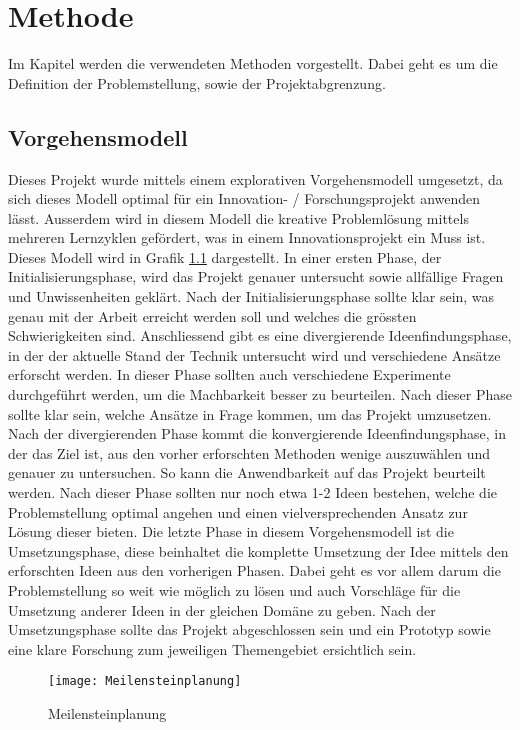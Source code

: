 \chapter{Methode}
\label{ch:Methode}
Im Kapitel  werden die verwendeten Methoden vorgestellt. Dabei geht es um die Definition der
Problemstellung, sowie der Projektabgrenzung.

\section{Vorgehensmodell}
\label{sec:Vorgehensmodell}
Dieses Projekt wurde mittels einem explorativen Vorgehensmodell umgesetzt, da sich dieses Modell optimal für ein
Innovation- / Forschungsprojekt anwenden lässt. Ausserdem wird in diesem Modell die kreative Problemlösung mittels
mehreren Lernzyklen gefördert, was in einem Innovationsprojekt ein Muss ist. Dieses Modell wird in Grafik
\ref{fig:Meilensteinplanung} dargestellt.
\newline
\newline
In einer ersten Phase, der Initialisierungsphase, wird das Projekt genauer untersucht sowie allfällige Fragen und
Unwissenheiten geklärt. Nach der Initialisierungsphase sollte klar sein, was genau mit der Arbeit erreicht werden soll
und welches die grössten Schwierigkeiten sind. 
\newline
\newline
Anschliessend gibt es eine divergierende Ideenfindungsphase, in der der aktuelle Stand der Technik untersucht wird und
verschiedene Ansätze erforscht werden. In dieser Phase sollten auch verschiedene Experimente durchgeführt werden, um die
Machbarkeit besser zu beurteilen. Nach dieser Phase sollte klar sein, welche Ansätze in Frage kommen, um das Projekt
umzusetzen.
\newline
\newline
Nach der divergierenden Phase kommt die konvergierende Ideenfindungsphase, in der das Ziel ist, aus den vorher
erforschten Methoden wenige auszuwählen und genauer zu untersuchen. So kann die Anwendbarkeit auf das Projekt beurteilt
werden. Nach dieser Phase sollten nur noch etwa 1-2 Ideen bestehen, welche die Problemstellung optimal angehen und einen
vielversprechenden Ansatz zur Lösung dieser bieten.
\newline
\newline
Die letzte Phase in diesem Vorgehensmodell ist die Umsetzungsphase, diese beinhaltet die komplette Umsetzung der Idee
mittels den erforschten Ideen aus den vorherigen Phasen. Dabei geht es vor allem darum die Problemstellung so weit wie
möglich zu lösen und auch Vorschläge für die Umsetzung anderer Ideen in der gleichen Domäne zu geben. Nach der
Umsetzungsphase sollte das Projekt abgeschlossen sein und ein Prototyp sowie eine klare Forschung zum jeweiligen
Themengebiet ersichtlich sein.
\begin{figure}[H]
	\centering
	\texttt{[image: Meilensteinplanung]}
	\caption{Meilensteinplanung}
	\label{fig:Meilensteinplanung}
\end{figure}
\noindent

